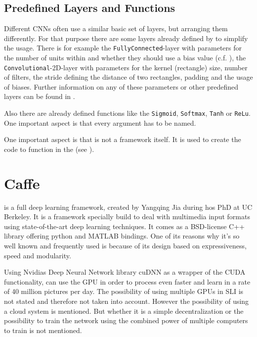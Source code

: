 \subsection{Predefined Layers and Functions} \label{subsec: CNNArchLang - predefines layers}
Different CNNs often use a similar basic set of layers, but arranging them differently. For that purpose there are some layers already defined by \cnnarch to simplify the usage.
There is for example the \texttt{FullyConnected}-layer with parameters for the number of units within and whether they should use a bias value (c.f. ), the \texttt{Convolutional}-2D-layer with parameters for the kernel (rectangle) size, number of filters, the stride defining the distance of two rectangles, padding and the usage of biases. Further information on any of these parameters or other predefined layers can be found in \cite{CNNArch}.

Also there are already defined functions like the \texttt{Sigmoid}, \texttt{Softmax}, \texttt{Tanh} or \texttt{ReLu}. 
One important aspect is that every argument has to be named. 

One important aspect is that \cnnarch is not a framework itself. It is used to create the code to function in the \mxnet (see ).

\section{Caffe} \label{sec: Caffe}


\caffe is a full deep learning framework, created by Yangqing Jia during hos PhD at UC Berkeley. It is a framework specially build to deal with multimedia input formats using state-of-the-art deep learning techniques. It comes as a BSD-license C++ library offering python and MATLAB bindings. One of its reasons why it's so well known and frequently used is because of its design based on expressiveness, speed and modularity.

Using Nvidias Deep Neural Network library cuDNN as a wrapper of the CUDA functionality, \caffe can use the GPU in order to process even faster and learn in a rate of 40 million pictures per day. The possibility of using multiple GPUs in SLI is not stated and therefore not taken into account. \cite{wiki:Caffe}
However the possibility of using a cloud system is mentioned. But whether it is a simple decentralization or the possibility to train the network using the combined power of multiple computers to train is not mentioned. \cite{jia2014caffe}

